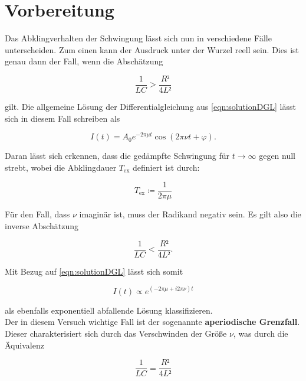 \section{Vorbereitung}

Das Abklingverhalten der Schwingung lässt sich nun in verschiedene Fälle unterscheiden. Zum einen kann der Ausdruck 
unter der Wurzel reell sein. Dies ist genau dann der Fall, wenn die Abschätzung

\begin{equation}
\label{eqn:reell}
    \frac{1}{LC} > \frac{R²}{4L²}
\end{equation}

\noindent gilt. Die allgemeine Lösung der Differentialgleichung aus \eqref{eqn:solutionDGL} lässt sich in diesem Fall 
schreiben als

\begin{equation*}
    I(t) = A_0e^{-2\pi\mu{}t}\cos\left(2\pi\nu{}t + \varphi\right).
\end{equation*}

\noindent Daran lässt sich erkennen, dass die gedämpfte Schwingung für $t \rightarrow \infty$ gegen null strebt, wobei
die Abklingdauer $T_\text{ex}$ definiert ist durch:

\begin{equation*}
    T_\text{ex} \coloneqq \frac{1}{2\pi\mu}
\end{equation*}

\noindent Für den Fall, dass $\nu$ imaginär ist, muss der Radikand negativ sein. Es gilt also die inverse Abschätzung 

\begin{equation}
\label{eqn:imaginaer}
    \frac{1}{LC} < \frac{R²}{4L²}.
\end{equation}

\noindent Mit Bezug auf \eqref{eqn:solutionDGL} lässt sich somit 

\begin{equation*}
    I(t) \propto e^{\left(-2\pi\mu + i2\pi\nu\right)t}
\end{equation*}

\noindent als ebenfalls exponentiell abfallende Lösung klassifizieren.\\
Der in diesem Versuch wichtige Fall ist der sogenannte \textbf{aperiodische Grenzfall}. Dieser charakterisiert sich durch 
das Verschwinden der Größe $\nu$, was durch die Äquivalenz 

\begin{equation}
\label{eqn:Grenzfall}
    \frac{1}{LC} = \frac{R²}{4L²}
\end{equation}

